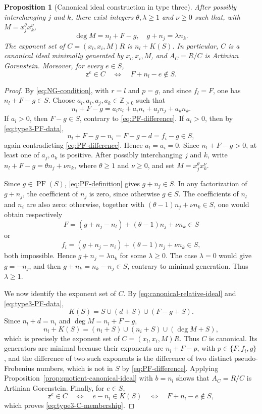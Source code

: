 \documentclass[10pt]{amsart}
\theoremstyle{plain}
\newtheorem{proposition}[lemma]{Proposition}
\begin{document}
\begin{proposition}[Canonical ideal construction in type three]\label{prop:type3-canonical}
After possibly interchanging \(j\) and \(k\), there exist integers
\(\theta,\lambda\ge1\) and \(\nu\ge0\) such that, with
\(M=x_j^\theta x_k^\nu\),
\begin{equation}\label{eq:type3-monomial}
\deg M=n_l+F-g,\quad g+n_j=\lambda n_k.
\end{equation}
The exponent set of
\(C=(x_l,x_i,M)R\) is \(n_l+K(S)\).  In particular,
\(C\) is a canonical ideal minimally generated by \(x_l,x_i,M\), and
\(A_C=R/C\) is Artinian Gorenstein.  Moreover, for every \(e\in S\),
\begin{equation}\label{eq:type3-C-membership}
\mathsf z^e\in C
\quad\Longleftrightarrow\quad
F+n_l-e\notin S.
\end{equation}
\end{proposition}

\begin{proof}
By \eqref{eq:NG-condition}, with \(r=l\) and \(p=g\), and since
\(f_l=F\), one has \(n_l+F-g\in S\).  Choose
\(a_l,a_i,a_j,a_k\in\mathbb Z_{\ge0}\) such that
\[
n_l+F-g=a_ln_l+a_in_i+a_jn_j+a_kn_k.
\]
If \(a_l>0\), then \(F-g\in S\), contrary to
\eqref{eq:PF-difference}.  If \(a_i>0\), then by
\eqref{eq:type3-PF-data},
\[
n_l+F-g-n_i=F-g-d=f_i-g\in S,
\]
again contradicting \eqref{eq:PF-difference}.  Hence
\(a_l=a_i=0\).  Since \(n_l+F-g>0\), at least one of \(a_j,a_k\)
is positive.  After possibly interchanging \(j\) and \(k\), write
\(n_l+F-g=\theta n_j+\nu n_k\), where
\(\theta\ge1\) and \(\nu\ge0\), and set
\(M=x_j^\theta x_k^\nu\).

Since \(g\in\operatorname{PF}(S)\), \eqref{eq:PF-definition} gives
\(g+n_j\in S\).  In any factorization of \(g+n_j\), the coefficient
of \(n_j\) is zero, since otherwise \(g\in S\).  The coefficients of
\(n_l\) and \(n_i\) are also zero: otherwise, together with
\((\theta-1)n_j+\nu n_k\in S\), one would obtain respectively
\[
F=(g+n_j-n_l)+(\theta-1)n_j+\nu n_k\in S
\]
or
\[
f_i=(g+n_j-n_i)+(\theta-1)n_j+\nu n_k\in S,
\]
both impossible.  Hence \(g+n_j=\lambda n_k\) for some
\(\lambda\ge0\).  The case \(\lambda=0\) would give \(g=-n_j\),
and then \(g+n_k=n_k-n_j\in S\), contrary to minimal generation.
Thus \(\lambda\ge1\).

We now identify the exponent set of \(C\). By \eqref{eq:canonical-relative-ideal} and
\eqref{eq:type3-PF-data},
\[
K(S)=S\cup(d+S)\cup(F-g+S).
\]
Since \(n_l+d=n_i\) and \(\deg M=n_l+F-g\),
\[
n_l+K(S)
=(n_l+S)\cup(n_i+S)\cup(\deg M+S),
\]
which is precisely the exponent set of \(C=(x_l,x_i,M)R\).
Thus \(C\) is canonical.  Its generators are minimal because their
exponents are \(n_l+F-p\), with \(p\in\{F,f_i,g\}\), and the
difference of two such exponents is the difference of two distinct
pseudo-Frobenius numbers, which is not in \(S\) by
\eqref{eq:PF-difference}.  Applying
Proposition~\ref{prop:quotient-canonical-ideal} with \(b=n_l\) shows
that \(A_C=R/C\) is Artinian Gorenstein.  Finally, for \(e\in S\),
\[
\mathsf z^e\in C
\quad\Longleftrightarrow\quad
e-n_l\in K(S)
\quad\Longleftrightarrow\quad
F+n_l-e\notin S,
\]
which proves \eqref{eq:type3-C-membership}.
\end{proof}
\end{document}
